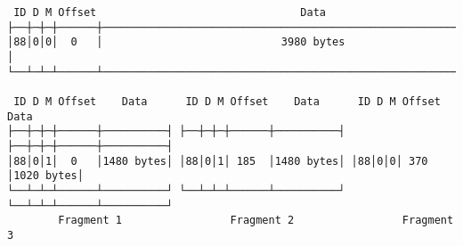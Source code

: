 \documentclass[varwidth=60em,crop]{standalone}
\begin{document}

\begin{verbatim}
 ID D M Offset                                Data                                 
├──┼─┼─┼──────┼────────────────────────────────────────────────────────────────┤
│88│0│0│  0   │                            3980 bytes                          │
└──┴─┴─┴──────┴────────────────────────────────────────────────────────────────┘

 ID D M Offset    Data      ID D M Offset    Data      ID D M Offset    Data   
├──┼─┼─┼──────┼──────────┤ ├──┼─┼─┼──────┼──────────┤ ├──┼─┼─┼──────┼──────────┤
│88│0│1│  0   │1480 bytes│ │88│0│1│ 185  │1480 bytes│ │88│0│0│ 370  │1020 bytes│
└──┴─┴─┴──────┴──────────┘ └──┴─┴─┴──────┴──────────┘ └──┴─┴─┴──────┴──────────┘
        Fragment 1                 Fragment 2                 Fragment 3
\end{verbatim}
\end{document}
